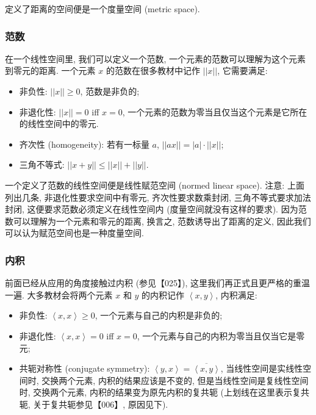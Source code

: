 定义了距离的空间便是一个度量空间 (metric space).


\subsubsection{范数}

在一个线性空间里, 我们可以定义一个范数,
一个元素的范数可以理解为这个元素到零元的距离. 一个元素 \(x\)
的范数在很多教材中记作 \(||x||\), 它需要满足:

\begin{itemize}

\item
  非负性: \(||x||\ge 0\), 范数是非负的;
\item
  非退化性: \(||x||=0\) iff \(x=0\),
  一个元素的范数为零当且仅当这个元素是它所在的线性空间中的零元.
\item
  齐次性 (homogeneity): 若有一标量 \(a\), \(||ax||=|a|\cdot||x||\);
\item
  三角不等式: \(||x+y||\le||x||+||y||\).
\end{itemize}

一个定义了范数的线性空间便是线性赋范空间 (normed linear space). 注意:
上面列出几条, 非退化性要求空间中有零元, 齐次性要求数乘封闭,
三角不等式要求加法封闭, 这便要求范数必须定义在线性空间内
(度量空间就没有这样的要求). 因为范数可以理解为一个元素和零元的距离,
换言之, 范数诱导出了距离的定义,
因此我们可以认为赋范空间也是一种度量空间.

\subsubsection{内积}

前面已经从应用的角度接触过内积 (参见【025】),
这里我们再正式且更严格的重温一遍. 大多教材会将两个元素 \(x\) 和 \(y\)
的内积记作 \(\left<x,y\right>\), 内积满足:

\begin{itemize}

\item
  非负性: \(\left<x,x\right>\ge0\), 一个元素与自己的内积是非负的;
\item
  非退化性: \(\left<x,x\right>=0\) iff \(x=0\),
  一个元素与自己的内积为零当且仅当它是零元;
\item
  共轭对称性 (conjugate symmetry):
  \(\left<y,x\right>=\overline{\left<x,y\right>}\),
  当线性空间是实线性空间时, 交换两个元素, 内积的结果应该是不变的,
  但是当线性空间是复线性空间时, 交换两个元素,
  内积的结果变为原先内积的复共轭 (上划线在这里表示复共轭,
  关于复共轭参见【006】, 原因见下).
\end{itemize}

